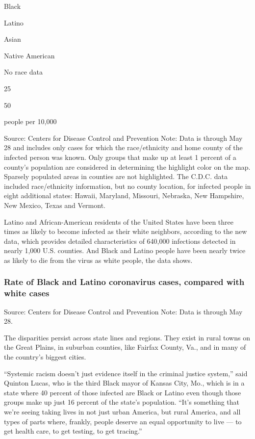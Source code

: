 Black

Latino

Asian

Native American

No race data

25

50

people per 10,000

Source: Centers for Disease Control and Prevention \textbar{} Note: Data
is through May 28 and includes only cases for which the race/ethnicity
and home county of the infected person was known. Only groups that make
up at least 1 percent of a county's population are considered in
determining the highlight color on the map. Sparsely populated areas in
counties are not highlighted. The C.D.C. data included race/ethnicity
information, but no county location, for infected people in eight
additional states: Hawaii, Maryland, Missouri, Nebraska, New Hampshire,
New Mexico, Texas and Vermont.

Latino and African-American residents of the United States have been
three times as likely to become infected as their white neighbors,
according to the new data, which provides detailed characteristics of
640,000 infections detected in nearly 1,000 U.S. counties. And Black and
Latino people have been nearly twice as likely to die from the virus as
white people, the data shows.

\hypertarget{rate-of-black-and-latino-coronavirus-cases-compared-with-white-cases}{%
\subsubsection{Rate of Black and Latino coronavirus cases, compared with
white
cases}\label{rate-of-black-and-latino-coronavirus-cases-compared-with-white-cases}}

Source: Centers for Disease Control and Prevention \textbar{} Note: Data
is through May 28.

The disparities persist across state lines and regions. They exist in
rural towns on the Great Plains, in suburban counties, like Fairfax
County, Va., and in many of the country's biggest cities.

``Systemic racism doesn't just evidence itself in the criminal justice
system,'' said Quinton Lucas, who is the third Black mayor of Kansas
City, Mo., which is in a state where 40 percent of those infected are
Black or Latino even though those groups make up just 16 percent of the
state's population. ``It's something that we're seeing taking lives in
not just urban America, but rural America, and all types of parts where,
frankly, people deserve an equal opportunity to live --- to get health
care, to get testing, to get tracing.''

